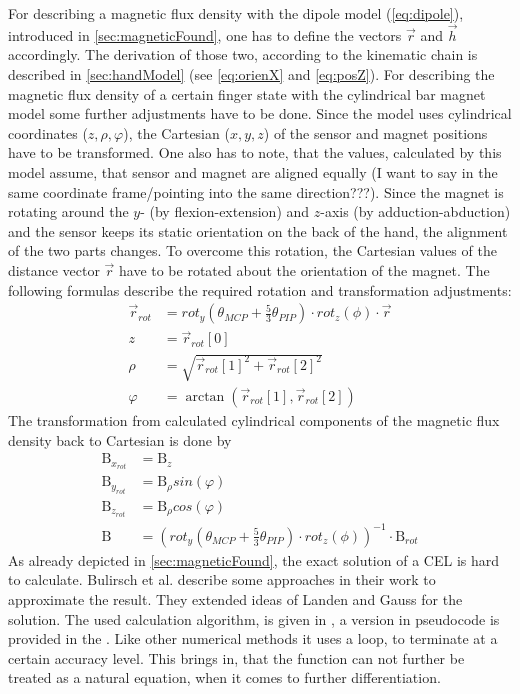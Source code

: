For describing a magnetic flux density with the dipole model (\ref{eq:dipole}), introduced in \ref{sec:magneticFound}, one has to define the vectors $ \vec{r} $ and $ \vec{h} $ accordingly. The derivation of those two, according to the kinematic chain is described in \ref{sec:handModel} (see \ref{eq:orienX} and \ref{eq:posZ}).
For describing the magnetic flux density of a certain finger state with the cylindrical bar magnet model some further adjustments have to be done. Since the model uses cylindrical coordinates ($ z, \rho, \varphi $), the Cartesian ($ x, y, z $) of the sensor and magnet positions have to be transformed. One also has to note, that the values, calculated by this model assume, that sensor and magnet are aligned equally (I want to say in the same coordinate frame/pointing into the same direction???). Since the magnet is rotating around the $ y $- (by flexion-extension) and $ z $-axis (by adduction-abduction) and the sensor keeps its static orientation on the back of the hand, the alignment of the two parts changes. To overcome this rotation, the Cartesian values of the distance vector $ \vec{r} $ have to be rotated about the orientation of the magnet. The following formulas describe the required rotation and transformation adjustments:
\begin{equation}
\begin{aligned}
\vec{r}_{rot} &= rot_{y}(\theta_{MCP} + \frac{5}{3} \theta_{PIP}) \cdot rot_{z}(\phi) \cdot \vec{r}\\[3pt]
z &= \vec{r}_{rot}[0]\\
\rho &= \sqrt{\vec{r}_{rot}[1]^{2} + \vec{r}_{rot}[2]^2}\\
\varphi &= \arctan(\vec{r}_{rot}[1], \vec{r}_{rot}[2])
\end{aligned}
\end{equation}
The transformation from calculated cylindrical components of the magnetic flux density back to Cartesian is done by
\begin{equation}
\begin{aligned}
\mathrm{B}_{x_{rot}} &= \mathrm{B}_{z}\\
\mathrm{B}_{y_{rot}} &= \mathrm{B}_{\rho}sin(\varphi)\\
\mathrm{B}_{z_{rot}} &= \mathrm{B}_{\rho}cos(\varphi)\\[3pt]
\mathrm{B} &= (rot_{y}(\theta_{MCP} + \frac{5}{3} \theta_{PIP}) \cdot rot_{z}(\phi))^{-1} \cdot \mathrm{B}_{rot}
\end{aligned}
\end{equation}
As already depicted in \ref{sec:magneticFound}, the exact solution of a \ac{CEL} is hard to calculate. Bulirsch et al. \cite{bulirsch1965numerical} describe some approaches in their work to approximate the result. They extended ideas of Landen and Gauss for the solution. The used calculation algorithm, is given in \cite{derby2010cylindrical}, a version in pseudocode is provided in the . Like other numerical methods it uses a loop, to terminate at a certain accuracy level. This brings in, that the function can not further be treated as a natural equation, when it comes to further differentiation.



